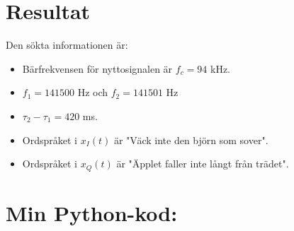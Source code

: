 \documentclass[10pt,twocolumn]{article}
\begin{document}
\section{Resultat}

Den sökta informationen är:
\begin{itemize}
\item Bärfrekvensen för nyttosignalen är $f_c=94$ kHz.
\item $f_1=141500$ Hz och $f_2=141501$ Hz
\item $\tau_2 - \tau_1 = 420$ ms.
\item Ordspråket i $x_I(t)$ är "Väck inte den björn som sover".
\item Ordspråket i $x_Q(t)$ är "Äpplet faller inte långt från trädet".
\end{itemize}

\clearpage

\onecolumn
\section*{Min Python-kod:}

\end{document}
